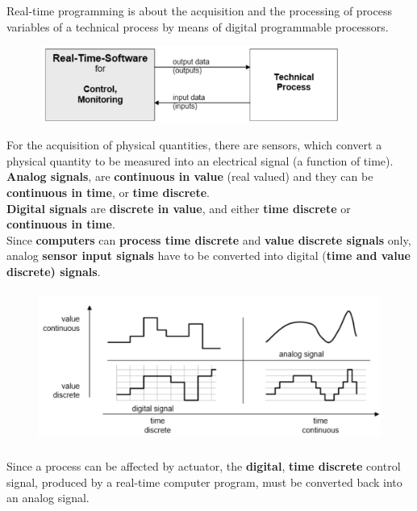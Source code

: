 Real-time programming is about the acquisition and the processing of process variables of a technical process by means of digital programmable processors. 

    \begin{figure}[h]
    \centering
    \includegraphics[width=10cm, height=2.5cm]{Images/image135.png}
    \label{fig:Fig 86}
    \end{figure}
    
For the acquisition of physical quantities, there are sensors, which convert a physical quantity to be measured into an electrical signal (a function of time).\\

\textbf{Analog signals}, are \textbf{continuous in value} (real valued) and they can be \textbf{continuous in time}, or \textbf{time discrete}. \\

\textbf{Digital signals} are \textbf{discrete in value}, and either \textbf{time discrete} or \textbf{continuous in time}.\\

Since \textbf{computers} can \textbf{process time discrete} and \textbf{value discrete signals} only, analog \textbf{sensor input signals} have to be converted into digital (\textbf{time and value discrete) signals}.

    \begin{figure}[h]
    \centering
    \includegraphics[width=14cm, height=5cm]{Images/image136.png}
    \label{fig:Fig 87}
    \end{figure}

Since a process can be affected by actuator, the \textbf{digital}, \textbf{time discrete} control signal, produced by a real-time computer program, must be converted back into an analog signal.

